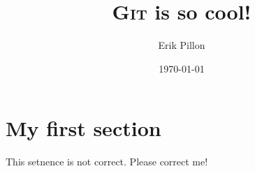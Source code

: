 \documentclass{article}
\author{Erik Pillon}
\title{\textsc{Git} is so cool!}
\date{\today}
\begin{document}
\maketitle
{}

\section{My first section}

This setnence is not correct. Please correct me!
\end{document}
